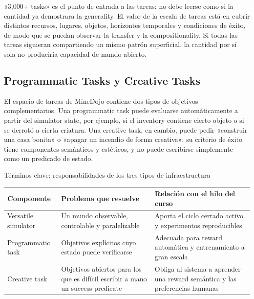 «3,000+ tasks» es el punto de entrada a las tareas; no debe leerse como si la cantidad ya demostrara la generality. El valor de la escala de tareas está en cubrir distintos recursos, lugares, objetos, horizontes temporales y condiciones de éxito, de modo que se puedan observar la transfer y la compositionality. Si todas las tareas siguieran compartiendo un mismo patrón superficial, la cantidad por sí sola no produciría capacidad de mundo abierto.

\subsection{Programmatic Tasks y Creative Tasks}

El espacio de tareas de MineDojo contiene dos tipos de objetivos complementarios. Una programmatic task puede evaluarse automáticamente a partir del simulator state, por ejemplo, si el inventory contiene cierto objeto o si se derrotó a cierta criatura. Una creative task, en cambio, puede pedir «construir una casa bonita» o «apagar un incendio de forma creativa»; su criterio de éxito tiene componentes semánticos y estéticos, y no puede escribirse simplemente como un predicado de estado.


\begin{knowledgebox}{Términos clave: responsabilidades de los tres tipos de infraestructura}
\begin{tabularx}{\textwidth}{@{}L{0.20\textwidth}X X@{}}
\toprule
Componente & Problema que resuelve & Relación con el hilo del curso \\
\midrule
Versatile simulator & Un mundo observable, controlable y paralelizable & Aporta el ciclo cerrado activo y experimentos reproducibles \\
Programmatic task & Objetivos explícitos cuyo estado puede verificarse & Adecuada para reward automática y entrenamiento a gran escala \\
Creative task & Objetivos abiertos para los que es difícil escribir a mano un success predicate & Obliga al sistema a aprender una reward semántica y las preferencias humanas \\
\bottomrule
\end{tabularx}
\end{knowledgebox}


